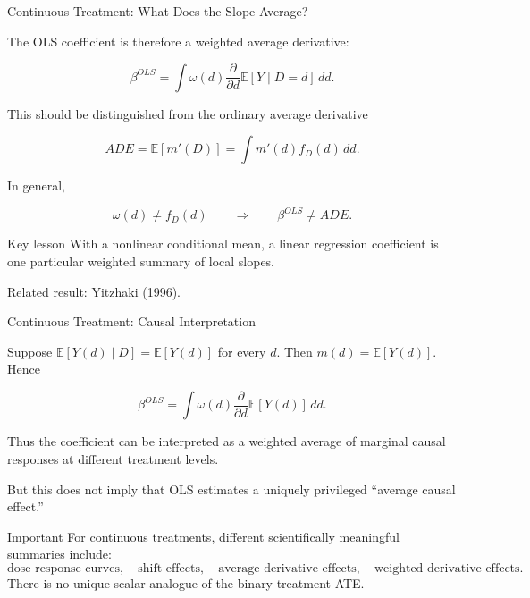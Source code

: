 \documentclass[aspectratio=169,11pt]{beamer}
\begin{document}
\begin{frame}{Continuous Treatment: What Does the Slope Average?}
\small

The OLS coefficient is therefore a weighted average derivative:

\[
\boxed{
\beta^{OLS}
=
\int
\omega(d)
\frac{\partial}{\partial d}
\mathbb{E}[Y\mid D=d]
\,dd.
}
\]

This should be distinguished from the ordinary average derivative

\[
ADE
=
\mathbb{E}[m'(D)]
=
\int
m'(d)f_D(d)\,dd.
\]

In general,

\[
\boxed{
\omega(d)\neq f_D(d)
}
\qquad\Longrightarrow\qquad
\boxed{
\beta^{OLS}\neq ADE.
}
\]

\begin{block}{Key lesson}
With a nonlinear conditional mean, a linear regression coefficient
is one particular weighted summary of local slopes.
\end{block}

\scriptsize
Related result: Yitzhaki (1996).

\end{frame}


\begin{frame}{Continuous Treatment: Causal Interpretation}
\small

Suppose
\(\mathbb{E}[Y(d)\mid D]=\mathbb{E}[Y(d)]\) for every \(d\).
Then \(m(d)=\mathbb{E}[Y(d)]\). Hence

\[
\boxed{
\beta^{OLS}
=
\int
\omega(d)
\frac{\partial}{\partial d}
\mathbb{E}[Y(d)]
\,dd.
}
\]

Thus the coefficient can be interpreted as a weighted average of
marginal causal responses at different treatment levels.

\medskip

But this does \alert{not} imply that OLS estimates a uniquely
privileged ``average causal effect.''

\begin{block}{Important}
For continuous treatments, different scientifically meaningful
summaries include:
\[
\text{dose-response curves},\quad
\text{shift effects},\quad
\text{average derivative effects},\quad
\text{weighted derivative effects}.
\]
There is no unique scalar analogue of the binary-treatment ATE.
\end{block}

\end{frame}
\end{document}
